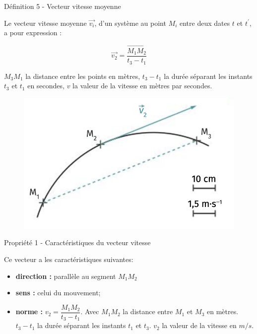 \documentclass[french, a4paper, 12pt, twocolumn, landscape]{article}
\begin{document}
\begin{definition}{Définition 5 - Vecteur vitesse moyenne}

		
	Le vecteur vitesse moyenne $\vec{v_i}$, d'un système au point $M_i$ entre deux dates $t$ et $t^\prime$, a pour expression : 

	$$\vec{v_2} = \dfrac{\overrightarrow{M_{1}M_{2}}}{t_{3}-t_{1}}$$

	$M_{3}M_{1}$ la distance entre les points en mètres, $t_{3}-t_{1}$ la durée séparant les instants $t_{3}$ et $t_{1}$ en secondes, $v$ la valeur de la vitesse en mètres par secondes.


\end{definition}\bigskip
\begin{figure}[ht]
	\centering
	\includegraphics[width=.5\linewidth]{SchemaVecteurVitesse.png}
\end{figure}
\begin{Proposition}{Propriété 1 - Caractéristiques du vecteur vitesse}

		
	Ce vecteur a les caractéristiques suivantes:
	\begin{itemize}
		\item \textbf{direction :} parallèle au segment $M_{1}M_{2}$
		\item \textbf{sens :} celui du mouvement;
		\item \textbf{norme :} $v_2 = \dfrac{M_{1}M_{2}}{t_{3}-t_{1}}.$ Avec $ M_{1}M_{2}$ la distance entre $M_1$ et $M_3$ en mètres. $t_3-t_1$ la durée séparant les instants $t_1$ et $t_3$. $v_2$ la valeur de la vitesse en $m/s$.

	\end{itemize}

\end{Proposition}


\end{document}
